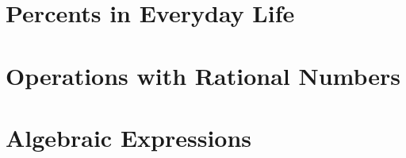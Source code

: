 \documentclass[12pt, fleqn, openany]{studyGuide}
\begin{document}
\chapter{Percents in Everyday Life}









\chapter{Operations with Rational Numbers}










\chapter{Algebraic Expressions}







\end{document}
